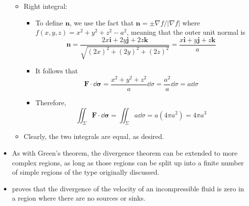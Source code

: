 \documentclass[../main.tex]{subfiles}
\begin{document}
\begin{itemize}
\begin{itemize}
\begin{itemize}
\begin{equation*}
            \end{equation*}
        \end{itemize}
        \item Right integral:
        \begin{itemize}
            \item To define $\mathbf{n}$, we use the fact that $\mathbf{n}=\pm\nabla f/|\nabla f|$ where $f(x,y,z)=x^2+y^2+z^2-a^2$, meaning that the outer unit normal is
            \begin{equation*}
                \mathbf{n} = \frac{2x\mathbf{i}+2y\mathbf{j}+2z\mathbf{k}}{\sqrt{(2x)^2+(2y)^2+(2z)^2}} = \frac{x\mathbf{i}+y\mathbf{j}+z\mathbf{k}}{a}
            \end{equation*}
            \item It follows that
            \begin{equation*}
                \mathbf{F}\cdot\dd{\bm{\sigma}} = \frac{x^2+y^2+z^2}{a}\dd{\sigma} = \frac{a^2}{a}\dd{\sigma} = a\dd{\sigma}
            \end{equation*}
            \item Therefore,
            \begin{equation*}
                \iint_\Sigma\mathbf{F}\cdot\dd{\bm{\sigma}} = \iint_\Sigma a\dd{\sigma} = a(4\pi a^2) = 4\pi a^3
            \end{equation*}
        \end{itemize}
        \item Clearly, the two integrals are equal, as desired.
    \end{itemize}
    \item As with Green's theorem, the divergence theorem can be extended to more complex regions, as long as those regions can be split up into a finite number of simple regions of the type originally discussed.
    \item \textcite{bib:Thomas} proves that the divergence of the velocity of an incompressible fluid is zero in a region where there are no sources or sinks.
\end{itemize}
\end{document}

